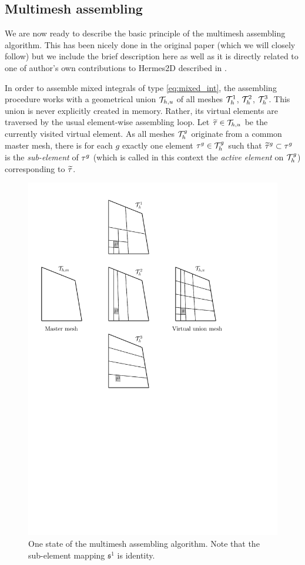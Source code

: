 \subsection{Multimesh assembling}
We are now ready to describe the basic principle of the multimesh assembling algorithm. This has been nicely done in 
the original paper \cite{Hermes-thermoelasticity} (which we will closely follow) but we include the brief description
here as well as it is directly related to one of author's own contributions to Hermes2D described in
.

In order to assemble mixed integrals of type \eqref{eq:mixed_int}, the assembling procedure works with a geometrical union $\mesh[h,u]$ of all meshes $\mesh^1$, $\mesh^2$, $\mesh^3$. This union is never 
explicitly created in memory.
Rather, its virtual elements are traversed by the usual element-wise assembling loop. Let $\widetilde\elem \in \mesh[h,u]$
be the currently visited virtual element. As all meshes $\mesh^g$ originate from a common master mesh, there is for each
$g$ exactly one element $\elem^g\in\mesh^g$ such that $\widetilde\elem^g\subset \elem^g$ is the \textit{sub-element} of 
$\elem^g$ (which is called in this context the \textit{active element} on $\mesh^g$) corresponding to $\widetilde\elem$.
\begin{figure}[!hb]
  \centering
  \includegraphics[scale=.9]{multimesh}
  \caption[Multimesh assembling]{One state of the multimesh assembling algorithm. Note that the sub-element mapping
  $\mathfrak{s}^1$ is identity.}
 	\label{fig:multimesh}
\end{figure}

